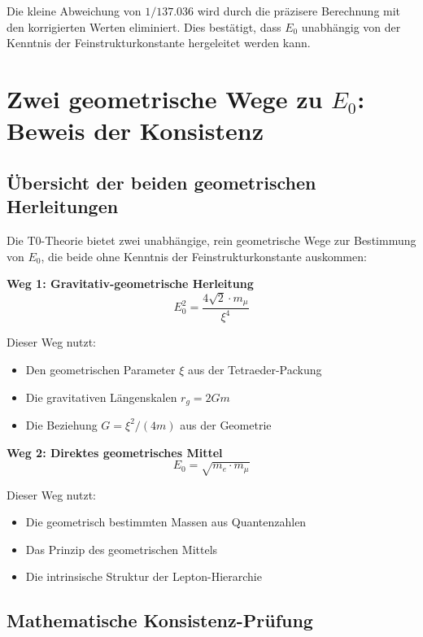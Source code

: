 \documentclass[12pt,a4paper]{article}
\begin{document}
	Die kleine Abweichung von $1/137.036$ wird durch die präzisere Berechnung mit den korrigierten Werten eliminiert. Dies bestätigt, dass $E_0$ unabhängig von der Kenntnis der Feinstrukturkonstante hergeleitet werden kann.
	
	\section{Zwei geometrische Wege zu $E_0$: Beweis der Konsistenz}
	
	\subsection{Übersicht der beiden geometrischen Herleitungen}
	
	Die T0-Theorie bietet zwei unabhängige, rein geometrische Wege zur Bestimmung von $E_0$, die beide ohne Kenntnis der Feinstrukturkonstante auskommen:
	
	\textbf{Weg 1: Gravitativ-geometrische Herleitung}
	\begin{equation}
		E_0^2 = \frac{4\sqrt{2} \cdot m_\mu}{\xi^4}
	\end{equation}
	
	Dieser Weg nutzt:
	\begin{itemize}
		\item Den geometrischen Parameter $\xi$ aus der Tetraeder-Packung
		\item Die gravitativen Längenskalen $r_g = 2Gm$
		\item Die Beziehung $G = \xi^2/(4m)$ aus der Geometrie
	\end{itemize}
	
	\textbf{Weg 2: Direktes geometrisches Mittel}
	\begin{equation}
		E_0 = \sqrt{m_e \cdot m_\mu}
	\end{equation}
	
	Dieser Weg nutzt:
	\begin{itemize}
		\item Die geometrisch bestimmten Massen aus Quantenzahlen
		\item Das Prinzip des geometrischen Mittels
		\item Die intrinsische Struktur der Lepton-Hierarchie
	\end{itemize}
	
	\subsection{Mathematische Konsistenz-Prüfung}
	
\end{document}
